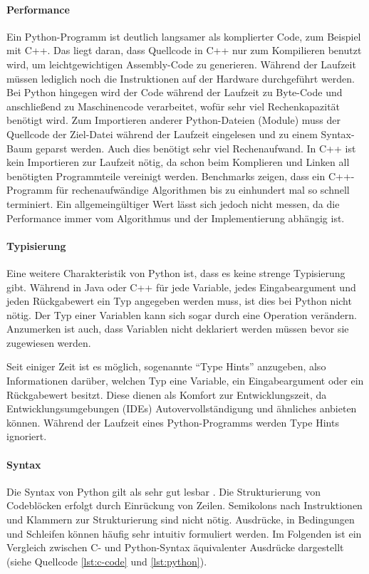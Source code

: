		\paragraph{Performance} Ein Python-Programm ist deutlich langsamer als komplierter Code, zum Beispiel mit C++. Das liegt daran, dass Quellcode in C++ nur zum Kompilieren benutzt wird, um leichtgewichtigen Assembly-Code zu generieren. Während der Laufzeit müssen lediglich noch die Instruktionen auf der Hardware durchgeführt werden.
		Bei Python hingegen wird der Code während der Laufzeit zu Byte-Code und anschließend zu Maschinencode verarbeitet, wofür sehr viel Rechenkapazität benötigt wird. Zum Importieren anderer Python-Dateien (Module) muss der Quellcode der Ziel-Datei während der Laufzeit eingelesen und zu einem Syntax-Baum geparst werden. Auch dies benötigt sehr viel Rechenaufwand. In C++ ist kein Importieren zur Laufzeit nötig, da schon beim Komplieren und Linken all benötigten Programmteile vereinigt werden. Benchmarks zeigen, dass ein C++-Programm für rechenaufwändige Algorithmen bis zu einhundert mal so schnell terminiert. Ein allgemeingültiger Wert lässt sich jedoch nicht messen, da die Performance immer vom Algorithmus und der Implementierung abhängig ist. \cite[vgl.][]{banchmarkgame2022cpppython}
		
		\paragraph{Typisierung} Eine weitere Charakteristik von Python ist, dass es keine strenge Typisierung gibt. Während in Java oder C++ für jede Variable, jedes Eingabeargument und jeden Rückgabewert ein Typ angegeben werden muss, ist dies bei Python nicht nötig. Der Typ einer Variablen kann sich sogar durch eine Operation verändern. Anzumerken ist auch, dass Variablen nicht deklariert werden müssen bevor sie zugewiesen werden.
		
		Seit einiger Zeit ist es möglich, sogenannte "`Type Hints"' anzugeben, also Informationen darüber, welchen Typ eine Variable, ein Eingabeargument oder ein Rückgabewert besitzt. Diese dienen als Komfort zur Entwicklungszeit, da Entwicklungsumgebungen (IDEs) Autovervollständigung und ähnliches anbieten können. Während der Laufzeit eines Python-Programms werden Type Hints ignoriert.
		
		\paragraph{Syntax} Die Syntax von Python gilt als sehr gut lesbar \cite[vgl.][]{bassi2007primer}. Die Strukturierung von Codeblöcken erfolgt durch Einrückung von Zeilen. Semikolons nach Instruktionen und Klammern zur Strukturierung sind nicht nötig. Ausdrücke, in Bedingungen und Schleifen können häufig sehr intuitiv formuliert werden. 
		Im Folgenden ist ein Vergleich zwischen C- und Python-Syntax äquivalenter Ausdrücke dargestellt (siehe Quellcode \ref{lst:c-code} und \ref{lst:python}).
	
